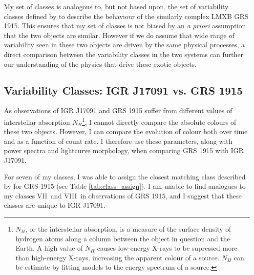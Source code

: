 \par My set of classes is analogous to, but not based upon, the set of variability classes defined by \citealt{Belloni_GRS_MI} to describe the behaviour of the similarly complex LMXB GRS 1915.  This ensures that my set of classes is not biased by an \textit{a priori} assumption that the two objects are similar.  However if we do assume that wide range of variability seen in these two objects are driven by the same physical processes, a direct comparison between the variability classes in the two systems can further our understanding of the physics that drive these exotic objects.

\subsection{Variability Classes: IGR J17091 vs. GRS 1915}

\label{sec:IGRcomp}

\par As observations of IGR J17091 and GRS 1915 suffer from different values of interstellar absorption $N_H$\footnote{$N_H$, or the interstellar absorption, is a measure of the surface density of hydrogen atoms along a column between the object in question and the Earth.  A high value of $N_H$ causes low-energy X-rays to be supressed more than high-energy X-rays, increasing the apparent colour of a source.  $N_H$ can be estimate by fitting models to the energy spectrum of a source.}, I cannot directly compare the absolute colours of these two objects.  However, I can compare the evolution of colour both over time and as a function of count rate.  I therefore use these parameters, along with power spectra and lightcurve morphology, when comparing GRS 1915 with IGR J17091.
\par For seven of my classes, I was able to assign the closest matching class described by \citealt{Belloni_GRS_MI} for GRS 1915 (see Table \ref{tab:class_assign}).  I am unable to find analogues to my classes VII\indexvii\ and VIII\indexviii\ in observations of GRS 1915, and I suggest that these classes are unique to IGR J17091.

